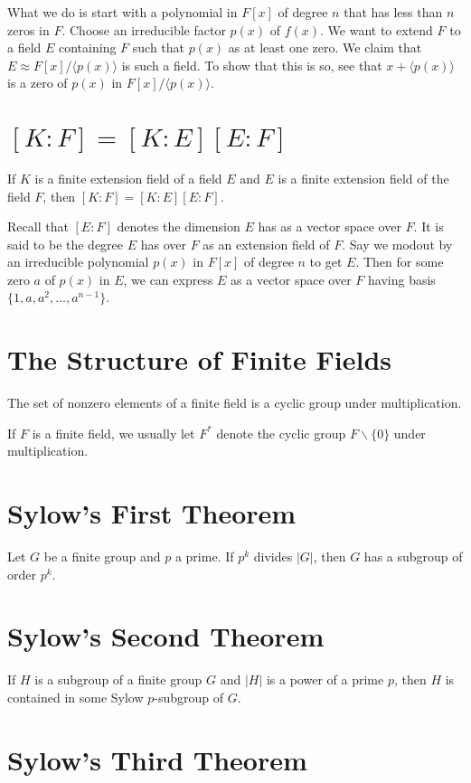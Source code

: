\documentclass{article}
\begin{document}
What we do is start with a polynomial in $F[x]$ of
degree $n$ that has less than $n$ zeros in $F$.
Choose an irreducible factor $p(x)$ of $f(x)$.
We want to extend $F$ to a field $E$ containing
$F$ such that $p(x)$ as at least one zero.
We claim that $E\approx F[x]/\langle p(x)\rangle$
is such a field.  To show that this is so,
see that $x+\langle p(x)\rangle$ is a
zero of $p(x)$ in $F[x]/\langle p(x)\rangle$.

\section*{$[K:F]=[K:E][E:F]$}

If $K$ is a finite extension field of a field $E$ and $E$ is
a finite extension field of the field $F$, then
$[K:F]=[K:E][E:F]$.

Recall that $[E:F]$ denotes the dimension $E$ has as a vector
space over $F$.  It is said to be the degree $E$ has over $F$
as an extension field of $F$.  Say we modout by an irreducible
polynomial $p(x)$ in $F[x]$ of degree $n$ to get $E$.
Then for some zero $a$ of $p(x)$ in $E$, we can express
$E$ as a vector space over $F$ having basis $\{1,a,a^2,\dots,a^{n-1}\}$.

\section*{The Structure of Finite Fields}

The set of nonzero elements of a finite field is a cyclic
group under multiplication.

If $F$ is a finite field, we usually let $F^*$ denote
the cyclic group $F\backslash\{0\}$ under multiplication.

\section*{Sylow's First Theorem}

Let $G$ be a finite group and $p$ a prime.
If $p^k$ divides $|G|$, then $G$ has a subgroup of order $p^k$.

\section*{Sylow's Second Theorem}

If $H$ is a subgroup of a finite group $G$ and $|H|$ is a power
of a prime $p$, then $H$ is contained in some Sylow $p$-subgroup
of $G$.

\section*{Sylow's Third Theorem}
\end{document}

